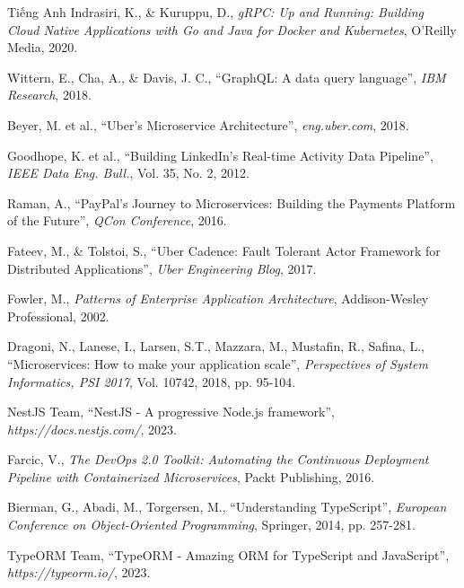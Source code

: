 \documentclass{uetgraduation}
\begin{document}
\begin{thebibliography}{9}
\begin{bibsection}{Tiếng Anh}
        Indrasiri, K., \& Kuruppu, D.,
        \textit{gRPC: Up and Running: Building Cloud Native Applications with Go and Java for Docker and Kubernetes},
        O'Reilly Media, 2020.

        Wittern, E., Cha, A., \& Davis, J. C.,
        ``GraphQL: A data query language'',
        \textit{IBM Research},
        2018.

        Beyer, M. et al.,
        ``Uber's Microservice Architecture'',
        \textit{eng.uber.com},
        2018.

        Goodhope, K. et al.,
        ``Building LinkedIn's Real-time Activity Data Pipeline'',
        \textit{IEEE Data Eng. Bull.},
        Vol. 35, No. 2, 2012.

        Raman, A.,
        ``PayPal's Journey to Microservices: Building the Payments Platform of the Future'',
        \textit{QCon Conference},
        2016.

        Fateev, M., \& Tolstoi, S.,
        ``Uber Cadence: Fault Tolerant Actor Framework for Distributed Applications'',
        \textit{Uber Engineering Blog},
        2017.

        Fowler, M.,
        \textit{Patterns of Enterprise Application Architecture},
        Addison-Wesley Professional, 2002.

        Dragoni, N., Lanese, I., Larsen, S.T., Mazzara, M., Mustafin, R., Safina, L.,
        ``Microservices: How to make your application scale'',
        \textit{Perspectives of System Informatics, PSI 2017},
        Vol. 10742, 2018, pp. 95-104.

        NestJS Team,
        ``NestJS - A progressive Node.js framework'',
        \textit{https://docs.nestjs.com/},
        2023.

        Farcic, V.,
        \textit{The DevOps 2.0 Toolkit: Automating the Continuous Deployment Pipeline with Containerized Microservices},
        Packt Publishing, 2016.

        Bierman, G., Abadi, M., Torgersen, M.,
        ``Understanding TypeScript'',
        \textit{European Conference on Object-Oriented Programming},
        Springer, 2014, pp. 257-281.

        TypeORM Team,
        ``TypeORM - Amazing ORM for TypeScript and JavaScript'',
        \textit{https://typeorm.io/},
        2023.


\end{bibsection}
\end{thebibliography}
\end{document}
